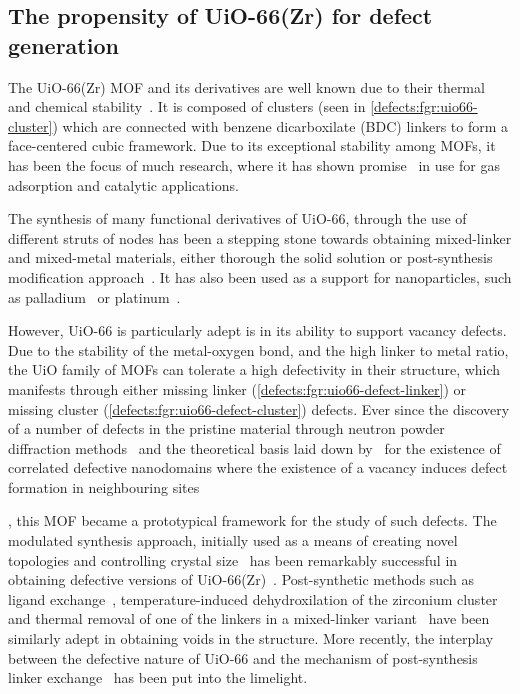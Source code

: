 \subsection{The propensity of UiO-66(Zr) for defect generation}

The UiO-66(Zr) MOF and its derivatives are well known due to
their thermal and chemical stability~\cite{cavkaNewZirconiumInorganic2008}.
It is composed of  clusters
(seen in \autoref{defects:fgr:uio66-cluster}) which are connected
with benzene dicarboxilate (BDC) linkers to form a face-centered cubic
framework. Due to its exceptional stability among MOFs, it has been the
focus of much research, where it has shown
promise~\cite{wiersumEvaluationUiO66GasBased2011} in use for gas
adsorption and catalytic applications.

The synthesis of many functional derivatives of UiO-66,
through the use of different struts of nodes has been a stepping 
stone towards obtaining mixed-linker and mixed-metal materials, 
either thorough the solid solution or post-synthesis modification
approach~\cite{kimPostsyntheticLigandExchange2012}.
It has also been used as a support for nanoparticles, such
as palladium~\cite{shenHighlyDispersedPalladium2013}
or platinum~\cite{oienProbingReactivePlatinum2015}.

However, UiO-66 is particularly adept is in its ability to support
vacancy defects. Due to the stability of the metal-oxygen bond, and the
high linker to metal ratio, the UiO family of MOFs can tolerate
a high defectivity in their structure, which manifests through
either missing linker
(\autoref{defects:fgr:uio66-defect-linker}) or missing
cluster (\autoref{defects:fgr:uio66-defect-cluster}) defects.
Ever since the discovery of a number of
defects in the pristine material through neutron powder diffraction
methods~\cite{wuUnusualHighlyTunable2013} and the theoretical
basis laid down by~\citeauthor{cliffeCorrelatedDefectNanoregions2014}
for the existence of correlated defective nanodomains where the
existence of a vacancy induces defect formation in neighbouring
sites~\author{cliffeCorrelatedDefectNanoregions2014}, this MOF
became a prototypical framework for the study of such defects.
The modulated synthesis approach, initially used as
a means of creating novel topologies and controlling crystal
size~\cite{guillermZirconiumMethacrylateOxocluster2010}
has been remarkably successful in obtaining defective versions
of UiO-66(Zr)~\cite{shearerDefectEngineeringTuning2016}.
Post-synthetic methods such as ligand
exchange~\cite{shearerFunctionalizingDefectsPostsynthetic2016},
temperature-induced dehydroxilation of the zirconium
cluster~\cite{valenzanoDisclosingComplexStructure2011} and
thermal removal of one of the linkers in a mixed-linker
variant~\cite{buekenTacklingDefectConundrum2017} have been
similarly adept in obtaining voids in the structure.
More recently, the interplay between the 
defective nature of UiO-66 and the mechanism of 
post-synthesis linker exchange~\cite{taddeiPostsyntheticLigandExchange2018}
has been put into the limelight.


